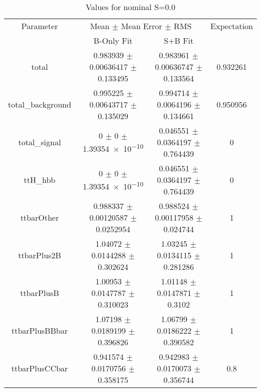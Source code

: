 \begin{table}
\centering
\caption{Values for nominal S=0.0}
\begin{tabular}{cccc}
\toprule
Parameter & \multicolumn{2}{c}{Mean $\pm$ Mean Error $\pm$ RMS} & Expectation\\
 & B-Only Fit & S+B Fit & \\
\midrule
total & \num{0.983939} $\pm$ \num{0.00636417} $\pm$ \num{0.133495} & \num{0.983961} $\pm$ \num{0.00636747} $\pm$ \num{0.133564} & \num{0.932261}\\
total\_background & \num{0.995225} $\pm$ \num{0.00643717} $\pm$ \num{0.135029} & \num{0.994714} $\pm$ \num{0.0064196} $\pm$ \num{0.134661} & \num{0.950956}\\
total\_signal & \num{0} $\pm$ \num{0} $\pm$ \num{1.39354e-10} & \num{0.046551} $\pm$ \num{0.0364197} $\pm$ \num{0.764439} & \num{0}\\
ttH\_hbb & \num{0} $\pm$ \num{0} $\pm$ \num{1.39354e-10} & \num{0.046551} $\pm$ \num{0.0364197} $\pm$ \num{0.764439} & \num{0}\\
ttbarOther & \num{0.988337} $\pm$ \num{0.00120587} $\pm$ \num{0.0252954} & \num{0.988524} $\pm$ \num{0.00117958} $\pm$ \num{0.024744} & \num{1}\\
ttbarPlus2B & \num{1.04072} $\pm$ \num{0.0144288} $\pm$ \num{0.302624} & \num{1.03245} $\pm$ \num{0.0134115} $\pm$ \num{0.281286} & \num{1}\\
ttbarPlusB & \num{1.00953} $\pm$ \num{0.0147787} $\pm$ \num{0.310023} & \num{1.01148} $\pm$ \num{0.0147871} $\pm$ \num{0.3102} & \num{1}\\
ttbarPlusBBbar & \num{1.07198} $\pm$ \num{0.0189199} $\pm$ \num{0.396826} & \num{1.06799} $\pm$ \num{0.0186222} $\pm$ \num{0.390582} & \num{1}\\
ttbarPlusCCbar & \num{0.941574} $\pm$ \num{0.0170756} $\pm$ \num{0.358175} & \num{0.942983} $\pm$ \num{0.0170073} $\pm$ \num{0.356744} & \num{0.8}\\
\bottomrule
\end{tabular}
\end{table}